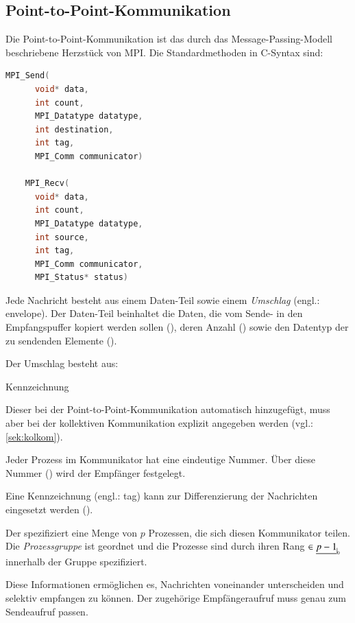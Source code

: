      
    \subsection{Point-to-Point-Kommunikation}
    \label{sek:ptpkom}
    Die Point-to-Point-Kommunikation ist das durch das Message-Passing-Modell beschriebene Herzstück von MPI.  
    Die Standardmethoden in C-Syntax sind:
    \begin{lstlisting}[language=C, label=lst:p2p_standard, caption={Die Syntax der standard Sende- und Empfangsoperationen}, numbers=none]
	MPI_Send(
	  void* data,
	  int count,
	  MPI_Datatype datatype,
	  int destination,
	  int tag,
	  MPI_Comm communicator)

	MPI_Recv(
	  void* data,
	  int count,
	  MPI_Datatype datatype,
	  int source,
	  int tag,
	  MPI_Comm communicator,
	  MPI_Status* status)

    \end{lstlisting}
    
    Jede Nachricht besteht aus einem Daten-Teil sowie einem \textit{Umschlag} (engl.: envelope). Der Daten-Teil beinhaltet die Daten, die vom Sende- in den Empfangspuffer kopiert
    werden sollen (), deren Anzahl () sowie den Datentyp der zu sendenden Elemente (). \citep{mpiv31}
    
    Der Umschlag besteht aus:
    \begin{labeling}{Kennzeichnung}
     \item[Sender] Dieser bei der Point-to-Point-Kommunikation automatisch hinzugefügt, muss aber bei der kollektiven Kommunikation explizit angegeben werden (vgl.: \autoref{sek:kolkom}).
     \item[Empfänger] Jeder Prozess im Kommunikator hat eine eindeutige Nummer. Über diese Nummer () wird der Empfänger festgelegt.
     \item[Kennzeichnung] Eine Kennzeichnung (engl.: tag) kann zur Differenzierung der Nachrichten eingesetzt werden ().
     \item[Kommunikator] Der  spezifiziert eine Menge von $p$ Prozessen, die sich diesen Kommunikator teilen. Die \textit{Prozessgruppe} ist geordnet und
			 die Prozesse sind durch ihren Rang  $\in \nullhaken{p-1}$ innerhalb der Gruppe spezifiziert.
    \end{labeling}
    Diese Informationen ermöglichen es, Nachrichten voneinander unterscheiden und selektiv empfangen zu können. Der zugehörige Empfängeraufruf muss genau zum Sendeaufruf
    passen. \citep{mpiv31}
    
